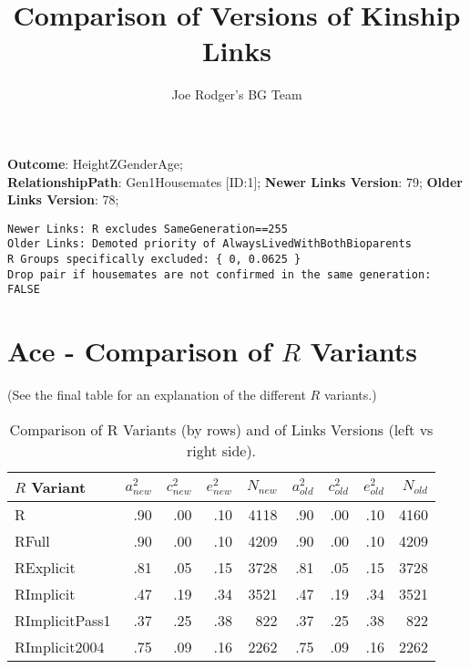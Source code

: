 \documentclass{article}\usepackage[]{graphicx}\usepackage[]{color}
\title{Comparison of Versions of Kinship Links}
\author{Joe Rodger's BG Team}
\makeatletter
\newenvironment{kframe}{%
 \def\at@end@of@kframe{}%
 \ifinner\ifhmode%
  \def\at@end@of@kframe{\end{minipage}}%
  \begin{minipage}{\columnwidth}%
 \fi\fi%
 \def\FrameCommand##1{\hskip\@totalleftmargin \hskip-\fboxsep
 \colorbox{shadecolor}{##1}\hskip-\fboxsep
     \hskip-\linewidth \hskip-\@totalleftmargin \hskip\columnwidth}%
 \MakeFramed {\advance\hsize-\width
   \@totalleftmargin\z@ \linewidth\hsize
   \@setminipage}}%
 {\par\unskip\endMakeFramed%
 \at@end@of@kframe}
\newenvironment{knitrout}{}{} %
\makeatother
\begin{document}
\maketitle
\setcounter{totalnumber}{8} %

\setlength{\parindent}{0pt}%











\textbf{Outcome}: HeightZGenderAge;\\
\textbf{RelationshipPath}: Gen1Housemates [ID:1];
\textbf{Newer Links Version}: 79;
\textbf{Older Links Version}: 78;

\begin{knitrout}
\color{fgcolor}\begin{kframe}
\begin{verbatim}
Newer Links: R excludes SameGeneration==255
Older Links: Demoted priority of AlwaysLivedWithBothBioparents
R Groups specifically excluded: { 0, 0.0625 }
Drop pair if housemates are not confirmed in the same generation: FALSE
\end{verbatim}
\end{kframe}
\end{knitrout}





\section{Ace - Comparison of $R$ Variants} 
(See the final table for an explanation of the different $R$ variants.)
\begin{table}[ht]
\centering
{\large
\begin{tabular}{l|rrrr|rrrr}
  \hline
$R$ Variant & $a_{new}^2$ & $c_{new}^2$ & $e_{new}^2$ & $N_{new}$ & $a_{old}^2$ & $c_{old}^2$ & $e_{old}^2$ & $N_{old}$ \\ 
  \hline
R & .90 & .00 & .10 & 4118 & .90 & .00 & .10 & 4160 \\ 
  RFull & .90 & .00 & .10 & 4209 & .90 & .00 & .10 & 4209 \\ 
  RExplicit & .81 & .05 & .15 & 3728 & .81 & .05 & .15 & 3728 \\ 
  RImplicit & .47 & .19 & .34 & 3521 & .47 & .19 & .34 & 3521 \\ 
  RImplicitPass1 & .37 & .25 & .38 &  822 & .37 & .25 & .38 &  822 \\ 
  RImplicit2004 & .75 & .09 & .16 & 2262 & .75 & .09 & .16 & 2262 \\ 
   \hline
\end{tabular}
}
\caption{Comparison of R Variants (by rows) and of Links Versions (left vs right side).} 
\end{table}
\end{document}
